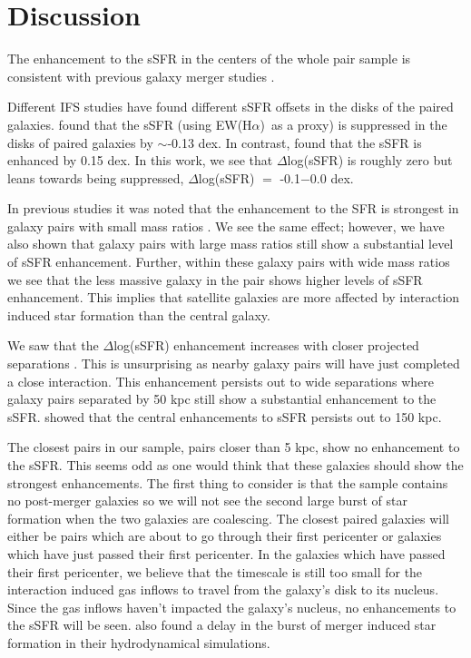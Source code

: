 \documentclass[iop,revtex4,twocolumn,apj,numberedappendix,appendixfloats]{emulateapj}
\newcommand{\ewha}{EW(H$\alpha$)}
\begin{document}
\section{Discussion}\label{sec:discussion}

The enhancement to the sSFR in the centers of the whole pair sample is consistent with previous galaxy merger studies \citet{Ellison:2008, Barrera-Ballesteros:2015, Pan:2019}. 

Different IFS studies have found different sSFR offsets in the disks of the paired galaxies. \citet{Barrera-Ballesteros:2015} found that the sSFR (using \ewha\ as a proxy) is suppressed in the disks of paired galaxies by $\sim$-0.13 dex. In contrast, \citet{Pan:2019} found that the sSFR is enhanced by 0.15 dex. In this work, we see that  $\Delta$log(sSFR) is roughly zero but leans towards being suppressed, $\Delta$log(sSFR) $=$ -0.1$-$0.0 dex. 

In previous studies it was noted that the enhancement to the SFR is strongest in galaxy pairs with small mass ratios \citet{Ellison:2008}. We see the same effect; however, we have also shown that galaxy pairs with large mass ratios still show a substantial level of sSFR enhancement. Further, within these galaxy pairs with wide mass ratios we see that the less massive galaxy in the pair shows higher levels of sSFR enhancement. This implies that satellite galaxies are more affected by interaction induced star formation than the central galaxy. 

 We saw that the $\Delta$log(sSFR) enhancement increases with closer projected separations \citet{Ellison:2008, Scudder:2012, Patton:2013}. This is unsurprising as nearby galaxy pairs will have just completed a close interaction. This enhancement persists out to wide separations where galaxy pairs separated by 50 kpc still show a substantial enhancement to the sSFR. \citet{Patton:2013} showed that the central enhancements to sSFR persists out to 150 kpc. 
 
The closest pairs in our sample, pairs closer than 5 kpc, show no enhancement to the sSFR. This seems odd as one would think that these galaxies should show the strongest enhancements. The first thing to consider is that the sample contains no post-merger galaxies so we will not see the second large burst of star formation when the two galaxies are coalescing. The closest paired galaxies will either be pairs which are about to go through their first pericenter or galaxies which have just passed their first pericenter. In the galaxies which have passed their first pericenter, we believe that the timescale is still too small for the interaction induced gas inflows to travel from the galaxy's disk to its nucleus. Since the gas inflows haven't impacted the galaxy's nucleus, no enhancements to the sSFR will be seen. \citet{Scudder:2012} also found a delay in the burst of merger induced star formation in their hydrodynamical simulations.
 
\end{document}
